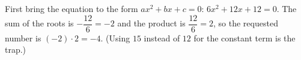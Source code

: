 First bring the equation to the form $ax^2+bx+c=0$: $6x^2+12x+12=0$. The sum of the roots is $-\dfrac{12}{6}=-2$ and the product is $\dfrac{12}{6}=2$, so the requested number is $(-2)\cdot2=\boxed{-4}$. (Using $15$ instead of $12$ for the constant term is the trap.)
